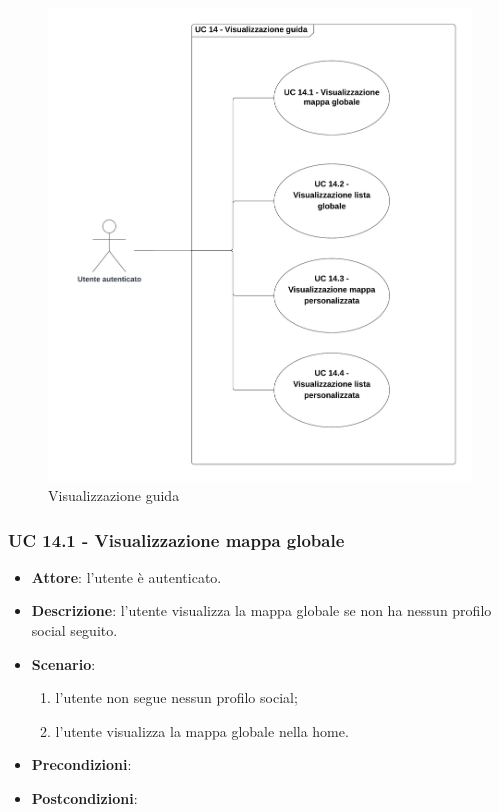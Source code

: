 \begin{figure}[!h]
    \includegraphics[width=13cm]{sezioni/Images/UC14_s.png}
    \centering
    \caption{Visualizzazione guida}
\end{figure}

\subsubsection{UC 14.1 - Visualizzazione mappa globale}
\begin{itemize}
    \item \textbf{Attore}: l'utente è autenticato.
    \item \textbf{Descrizione}: l'utente visualizza la mappa globale se non ha nessun profilo social seguito.
    \item \textbf{Scenario}:
    \begin{enumerate}
        \item l'utente non segue nessun profilo social;
        \item l'utente visualizza la mappa globale nella home.
    \end{enumerate}

    \item \textbf{Precondizioni}: %
    \item \textbf{Postcondizioni}: %
\end{itemize}

